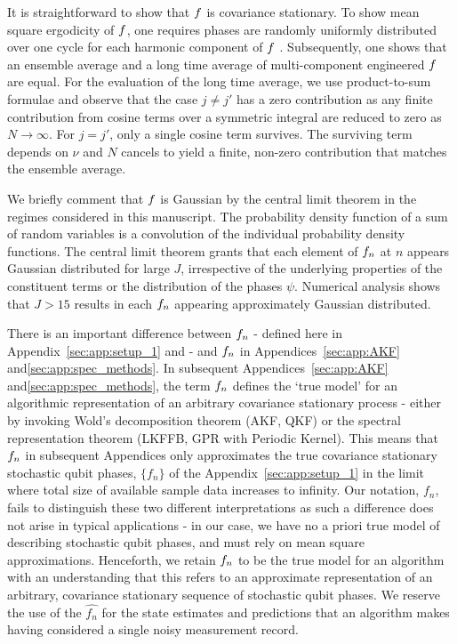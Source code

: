 It is straightforward to show that $f$ is covariance stationary. To show mean square ergodicity of $f$, one requires phases are randomly uniformly distributed over one cycle for each harmonic component of $f$ \cite{gelb1974applied}. Subsequently, one shows that an ensemble average and a long time average of multi-component engineered $f$ are equal. For the evaluation of the long time average, we use product-to-sum formulae and observe that the case $j\neq j'$ has a zero contribution as any finite contribution from cosine terms over a symmetric integral are reduced to zero as $N \rightarrow \infty $.  For $j = j'$, only a single cosine term survives. The surviving term depends on $\nu$ and $N$ cancels to yield a finite, non-zero contribution that matches the ensemble average.

We briefly comment that $f$ is Gaussian by the central limit theorem in the regimes considered in this manuscript. The probability density function of a sum of random variables is a convolution of the individual probability density functions. The central limit theorem grants that each element of $f_n$ at $n$ appears Gaussian distributed for large $J$, irrespective of the underlying properties of the constituent terms or the distribution of the phases $\psi$. Numerical analysis shows that $J > 15$ results in each $f_n$ appearing approximately Gaussian distributed. 

There is an important difference between $f_n$ - defined here in Appendix~\ref{sec:app:setup_1} and - and $f_n $ in Appendices~\ref{sec:app:AKF} and\nobreakspace  \ref {sec:app:spec_methods}.  In subsequent Appendices~\ref{sec:app:AKF} and\nobreakspace  \ref {sec:app:spec_methods}, the term $f_n $  defines the `true model' for an algorithmic representation of an arbitrary covariance stationary process - either by invoking Wold's decomposition theorem (AKF, QKF) or the spectral representation theorem (LKFFB, GPR with Periodic Kernel). This means that $f_n $ in subsequent Appendices only approximates the true covariance stationary stochastic qubit phases, $\{f_n\}$ of the Appendix~\ref{sec:app:setup_1} in the limit where total size of available sample data increases to infinity. Our notation, $f_n$, fails to distinguish these two different interpretations as such a difference does not arise in typical applications - in our case, we have no a priori true model of describing stochastic qubit phases, and must rely on mean square approximations. Henceforth, we retain $f_n $ to be the true model for an algorithm with an understanding that this refers to an approximate representation of an arbitrary, covariance stationary sequence of stochastic qubit phases. We reserve the use of the $\hat{f_n}$ for the state estimates and predictions that an algorithm makes having considered a single noisy measurement record. 


